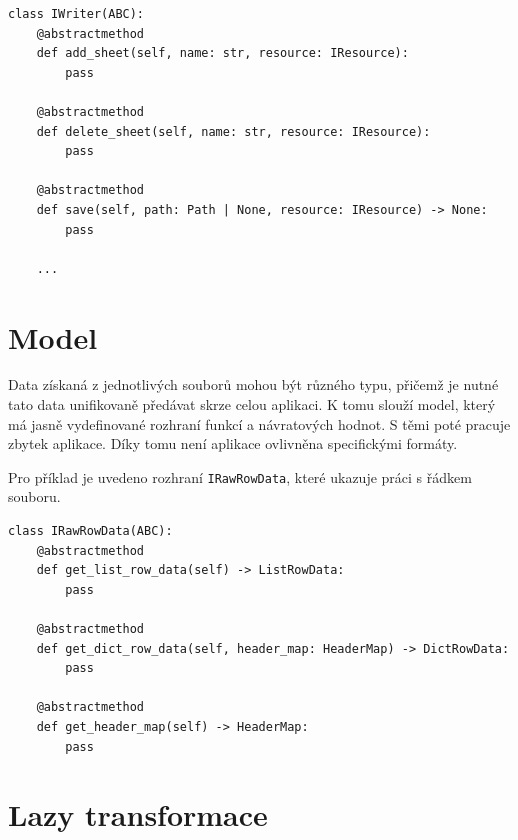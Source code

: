 \begin{listing}[H]
    \begin{verbatim}
class IWriter(ABC):
	@abstractmethod
	def add_sheet(self, name: str, resource: IResource):
		pass

	@abstractmethod
	def delete_sheet(self, name: str, resource: IResource):
		pass

	@abstractmethod
	def save(self, path: Path | None, resource: IResource) -> None:
		pass

    ...
    \end{verbatim}
    
    \caption{Rozhraní komponenty \texttt{IWriter} - vlastní tvorba}
    \label{list:demo-library}
\end{listing}

\section{Model}

Data získaná z jednotlivých souborů mohou být různého typu, přičemž je nutné tato data unifikovaně předávat skrze celou aplikaci. K tomu slouží model, který má jasně vydefinované rozhraní funkcí a návratových hodnot. S těmi poté pracuje zbytek aplikace. Díky tomu není aplikace ovlivněna specifickými formáty.

Pro příklad je uvedeno rozhraní \texttt{IRawRowData}, které ukazuje práci s řádkem souboru.

\begin{listing}[H]
    \begin{verbatim}
class IRawRowData(ABC):
    @abstractmethod
    def get_list_row_data(self) -> ListRowData:
        pass

    @abstractmethod
    def get_dict_row_data(self, header_map: HeaderMap) -> DictRowData:
        pass

    @abstractmethod
    def get_header_map(self) -> HeaderMap:
        pass
    \end{verbatim}
    
    \caption{Rozhraní modelu \texttt{IRawRowData} - vlastní tvorba}
    \label{list:demo-library}
\end{listing}

\section{Lazy transformace}
\label{laze transform}

